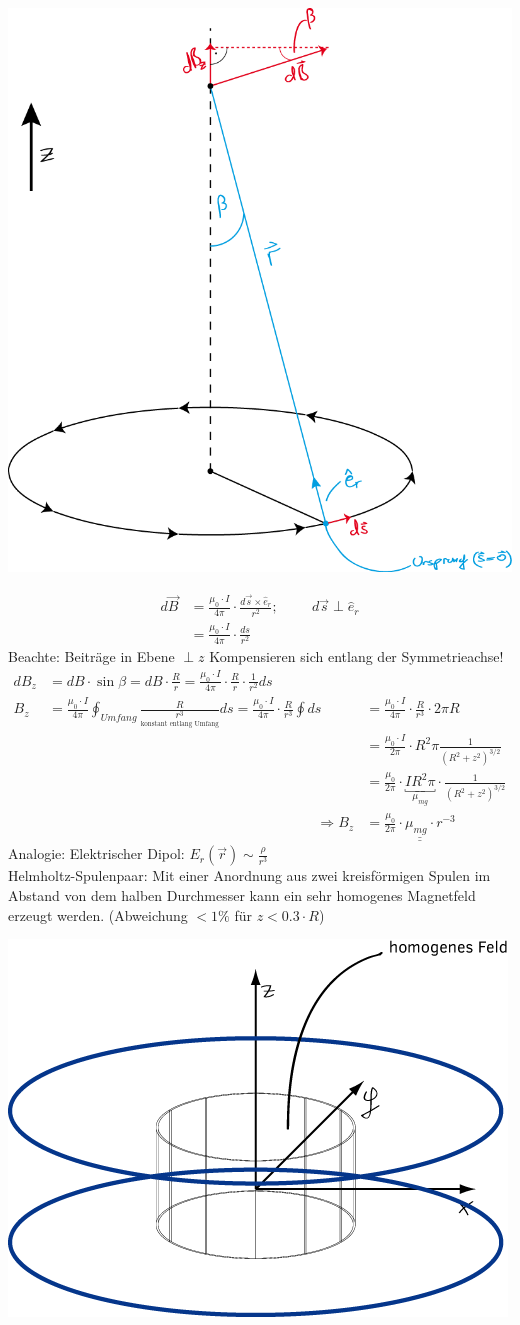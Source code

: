 \begin{center}
	\includegraphics[width=0.6\linewidth]{skizzen/16/16_2B12}
\end{center}
\begin{align*}
	d\vec{B} &= \frac{\mu_0 \cdot I}{4\pi} \cdot \frac{d\vec{s} \times \hat{e}_r}{r^2} ;\hspace{1cm} d\vec{s} \perp \hat{e}_r\\
	&=\frac{\mu_0 \cdot I}{4\pi} \cdot \frac{ds}{r^2}
\end{align*}
Beachte: Beiträge in Ebene $ \perp z$ Kompensieren sich entlang der Symmetrieachse!
\begin{align*}
 dB_z &= dB\cdot \sin\beta = dB \cdot \frac{R}{r} = \frac{\mu_0 \cdot I}{4\pi} \cdot \frac{R}{r} \cdot \frac{1}{r^2} ds\\
 B_z &= \frac{\mu_0 \cdot I}{4\pi} {\displaystyle\oint_{Umfang}} \frac{R}{\underset{\text{konstant entlang Umfang}}{r^3}} ds = \frac{\mu_0 \cdot I}{4\pi} \cdot \frac{R}{r^3} {\displaystyle\oint}ds &&= \frac{\mu_0 \cdot I}{4\pi} \cdot \frac{R}{r^3} \cdot 2\pi R\\
 & &&=\frac{\mu_0 \cdot I}{2\pi} \cdot R^2\pi\frac{1}{(R^2+z^2)^{3/2}}\\
 & &&= \frac{\mu_0}{2\pi} \cdot \underbracket{\boxed{IR^2\pi}}_{\mu_{mg}} \cdot \frac{1}{(R^2+z^2)^{3/2}}\\
  && \Rightarrow B_z &=\underline{\underline{ \frac{\mu_0}{2\pi} \cdot \mu_{mg} \cdot r^{-3}}}
\end{align*}
Analogie: Elektrischer Dipol: $ E_r(\vec{r}) \sim \frac{\rho}{r^3} $\\
Helmholtz-Spulenpaar:
Mit einer Anordnung aus zwei kreisförmigen Spulen im Abstand von dem halben Durchmesser kann ein sehr homogenes Magnetfeld erzeugt werden. (Abweichung $ <1\% $ für $ z<0.3\cdot R $) \begin{center}
	\includegraphics[width=0.5\linewidth]{skizzen/16/16_2B13}
\end{center}

